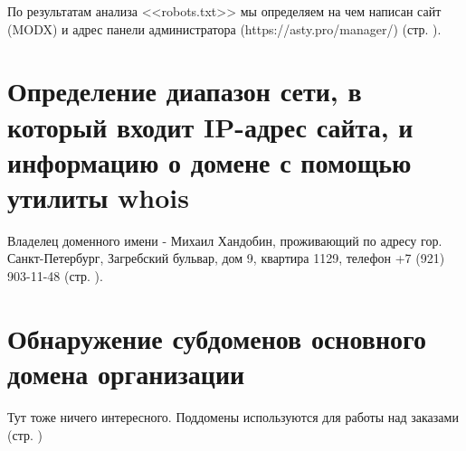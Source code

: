 По результатам анализа <<robots.txt>> мы определяем на чем написан сайт (MODX) и адрес панели администратора (https://asty.pro/manager/) (стр. \pageref{modx}).

\section{Определение диапазон сети, в который входит IP-адрес сайта, и информацию о домене с помощью утилиты whois}

Владелец доменного имени - Михаил Хандобин, проживающий по адресу гор. Санкт-Петербург, Загребский бульвар, дом 9, квартира 1129, телефон +7 (921) 903-11-48 (стр. \pageref{whois}).

\section{Обнаружение субдоменов основного домена организации}

Тут тоже ничего интересного. Поддомены используются для работы над заказами (стр. \pageref{sublstr})

